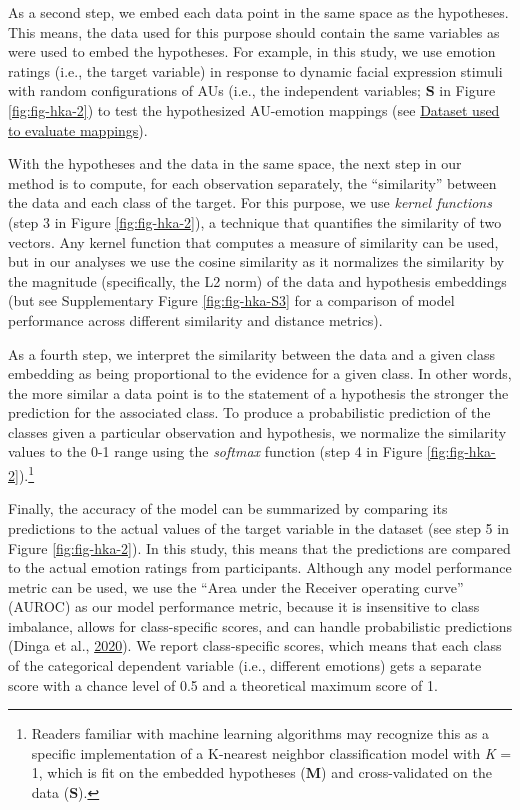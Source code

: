 \documentclass[12pt,american,a4paper,oneside,]{memoir} %
\let\rmarkdownfootnote\footnote%
\def\footnote{\protect\rmarkdownfootnote}
\begin{document}
As a second step, we embed each data point in the same space as the hypotheses. This means, the data used for this purpose should contain the same variables as were used to embed the hypotheses. For example, in this study, we use emotion ratings (i.e., the target variable) in response to dynamic facial expression stimuli with random configurations of AUs (i.e., the independent variables; \(\mathbf{S}\) in Figure \ref{fig:fig-hka-2}) to test the hypothesized AU-emotion mappings (see \protect\hyperlink{hka-dataset}{Dataset used to evaluate mappings}).

With the hypotheses and the data in the same space, the next step in our method is to compute, for each observation separately, the ``similarity'' between the data and each class of the target. For this purpose, we use \emph{kernel functions} (step 3 in Figure \ref{fig:fig-hka-2}), a technique that quantifies the similarity of two vectors. Any kernel function that computes a measure of similarity can be used, but in our analyses we use the cosine similarity as it normalizes the similarity by the magnitude (specifically, the L2 norm) of the data and hypothesis embeddings (but see Supplementary Figure \ref{fig:fig-hka-S3} for a comparison of model performance across different similarity and distance metrics).

As a fourth step, we interpret the similarity between the data and a given class embedding as being proportional to the evidence for a given class. In other words, the more similar a data point is to the statement of a hypothesis the stronger the prediction for the associated class. To produce a probabilistic prediction of the classes given a particular observation and hypothesis, we normalize the similarity values to the 0-1 range using the \emph{softmax} function (step 4 in Figure \ref{fig:fig-hka-2}).\footnote{Readers familiar with machine learning algorithms may recognize this as a specific implementation of a K-nearest neighbor classification model with \emph{K} = 1, which is fit on the embedded hypotheses (\(\mathbf{M}\)) and cross-validated on the data (\(\mathbf{S}\)).}

Finally, the accuracy of the model can be summarized by comparing its predictions to the actual values of the target variable in the dataset (see step 5 in Figure \ref{fig:fig-hka-2}). In this study, this means that the predictions are compared to the actual emotion ratings from participants. Although any model performance metric can be used, we use the ``Area under the Receiver operating curve'' (AUROC) as our model performance metric, because it is insensitive to class imbalance, allows for class-specific scores, and can handle probabilistic predictions (Dinga et al., \protect\hyperlink{ref-Dinga2020-si}{2020}). We report class-specific scores, which means that each class of the categorical dependent variable (i.e., different emotions) gets a separate score with a chance level of 0.5 and a theoretical maximum score of 1.
\end{document}
